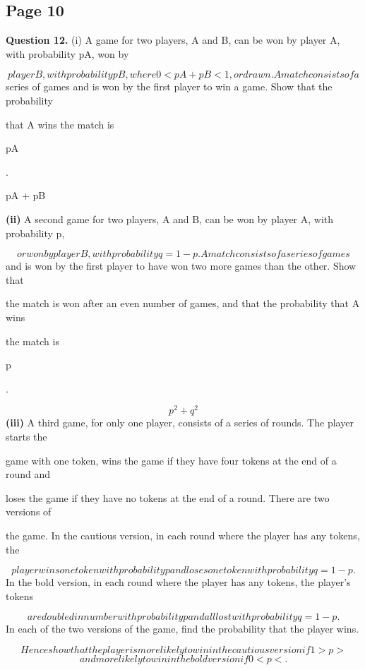\documentclass[12pt]{article}
\begin{document}
\subsection*{Page 10}
\begin{flushleft}
\bigskip\textbf{Question 12.} (i) A game for two players, A and B, can be won by player A, with probability pA, won by\par
\[player B, with probability pB, where 0 < pA + pB < 1, or drawn. A match consists of a\]
series of games and is won by the first player to win a game. Show that the probability\par
that A wins the match is\par
pA\par
.\par
pA + pB\par
\textbf{(ii)} A second game for two players, A and B, can be won by player A, with probability p,\par
\[or won by player B, with probability q = 1 - p. A match consists of a series of games\]
and is won by the first player to have won two more games than the other. Show that\par
the match is won after an even number of games, and that the probability that A wins\par
the match is\par
p\par
.\par
\[p^2 + q^2\]
\textbf{(iii)} A third game, for only one player, consists of a series of rounds. The player starts the\par
game with one token, wins the game if they have four tokens at the end of a round and\par
loses the game if they have no tokens at the end of a round. There are two versions of\par
the game. In the cautious version, in each round where the player has any tokens, the\par
\[player wins one token with probability p and loses one token with probability q = 1-p.\]
In the bold version, in each round where the player has any tokens, the player's tokens\par
\[are doubled in number with probability p and all lost with probability q = 1 - p.\]
In each of the two versions of the game, find the probability that the player wins.\par
\[Hence show that the player is more likely to win in the cautious version if 1 > p >\]
\[and more likely to win in the bold version if 0 < p < .\]
\end{flushleft}
\end{document}

